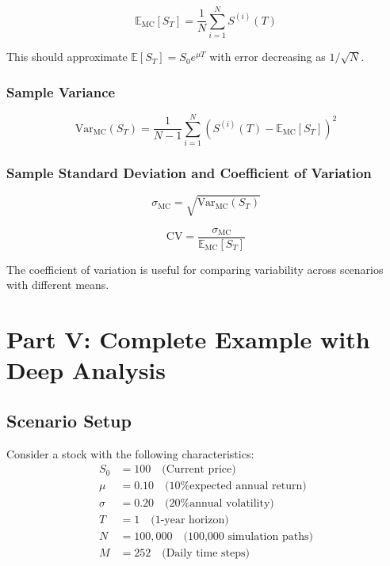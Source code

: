\documentclass[12pt,a4paper]{article}
\begin{document}
\begin{equation}
\mathbb{E}_{\text{MC}}[S_T] = \frac{1}{N} \sum_{i=1}^{N} S^{(i)}(T)
\end{equation}

This should approximate $\mathbb{E}[S_T] = S_0 e^{\mu T}$ with error decreasing as $1/\sqrt{N}$.

\subsubsection{Sample Variance}

\begin{equation}
\text{Var}_{\text{MC}}(S_T) = \frac{1}{N-1} \sum_{i=1}^{N} \left(S^{(i)}(T) - \mathbb{E}_{\text{MC}}[S_T]\right)^2
\end{equation}

\subsubsection{Sample Standard Deviation and Coefficient of Variation}

\begin{equation}
\sigma_{\text{MC}} = \sqrt{\text{Var}_{\text{MC}}(S_T)}
\end{equation}

\begin{equation}
\text{CV} = \frac{\sigma_{\text{MC}}}{\mathbb{E}_{\text{MC}}[S_T]}
\end{equation}

The coefficient of variation is useful for comparing variability across scenarios with different means.

\newpage

\section{Part V: Complete Example with Deep Analysis}

\subsection{Scenario Setup}

Consider a stock with the following characteristics:
\begin{align}
S_0 &= 100 \quad \text{(Current price)} \\
\mu &= 0.10 \quad \text{(10\% expected annual return)} \\
\sigma &= 0.20 \quad \text{(20\% annual volatility)} \\
T &= 1 \quad \text{(1-year horizon)} \\
N &= 100,000 \quad \text{(100,000 simulation paths)} \\
M &= 252 \quad \text{(Daily time steps)}
\end{align}
\end{document}
